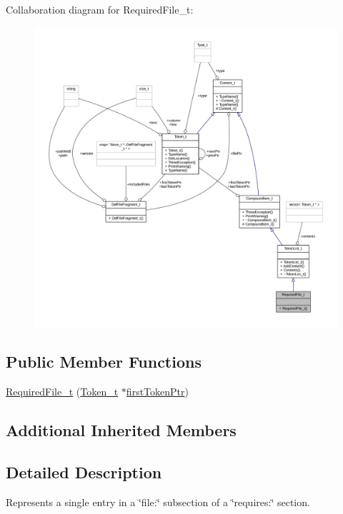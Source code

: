 Collaboration diagram for Required\+File\+\_\+t\+:
\nopagebreak
\begin{figure}[H]
\begin{center}
\leavevmode
\includegraphics[width=350pt]{struct_required_file__t__coll__graph}
\end{center}
\end{figure}
\subsection*{Public Member Functions}
\begin{DoxyCompactItemize}
\item 
\hyperlink{struct_required_file__t_a90232f4ef740985bbe4507b4256740e9}{Required\+File\+\_\+t} (\hyperlink{struct_token__t}{Token\+\_\+t} $\ast$\hyperlink{struct_compound_item__t_a4d95dc788120f627e332491589d20c5c}{first\+Token\+Ptr})
\end{DoxyCompactItemize}
\subsection*{Additional Inherited Members}


\subsection{Detailed Description}
Represents a single entry in a \char`\"{}file\+:\char`\"{} subsection of a \char`\"{}requires\+:\char`\"{} section. 

